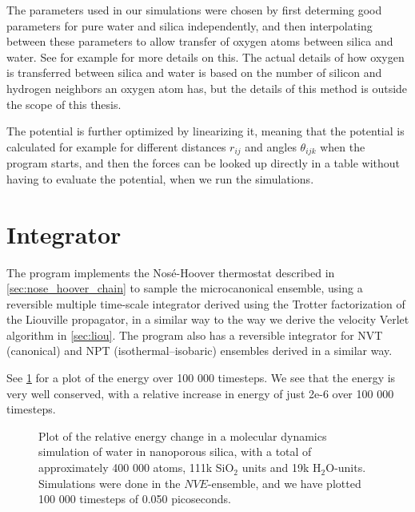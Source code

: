 The parameters used in our simulations were chosen by first determing good parameters for pure water and silica independently, and then interpolating between these parameters to allow transfer of oxygen atoms between silica and water. See for example \cite{vashishta1990interaction} for more details on this. The actual details of how oxygen is transferred between silica and water is based on the number of silicon and hydrogen neighbors an oxygen atom has, but the details of this method is outside the scope of this thesis.

The potential is further optimized by linearizing it, meaning that the potential is calculated for example for different distances $r_{ij}$ and angles $\theta_{ijk}$ when the program starts, and then the forces can be looked up directly in a table without having to evaluate the potential, when we run the simulations.


\section{Integrator\label{sec:sio2_integrator}}
%
The program implements the Nos\'e-Hoover thermostat described in \cref{sec:nose_hoover_chain} to sample the microcanonical ensemble, using a reversible multiple time-scale integrator derived using the Trotter factorization of the Liouville propagator\cite{tuckerman1992reversible}, in a similar way to the way we derive the velocity Verlet algorithm in \cref{sec:liou}. The program also has a reversible integrator for NVT (canonical) and NPT (isothermal–isobaric) ensembles\cite{martyna1996explicit} derived in a similar way. 

See \cref{fig:energy_conservation_plot} for a plot of the energy over 100 000 timesteps. We see that the energy is very well conserved, with a relative increase in energy of just 2e-6 over 100 000 timesteps.
%
\begin{figure}[!htb]%
    \centering%
    \caption{%
        Plot of the relative energy change in a molecular dynamics simulation of water in nanoporous silica, with a total of approximately 400 000 atoms, 111k SiO$_2$ units and 19k H$_2$O-units. Simulations were done in the $NVE$-ensemble, and we have plotted 100 000 timesteps of 0.050 picoseconds.%
        \label{fig:energy_conservation_plot}%
    }%
\end{figure}%

